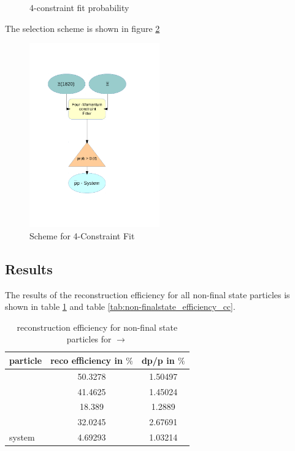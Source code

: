 	\begin{figure}
		\centering
		\caption{4-constraint fit probability}
		\label{fig:xisys_prob}
	\end{figure}
	
	The selection scheme is shown in figure \ref{fig:fourconstraintfit}
	 
	\begin{figure}
		\centering
			\includegraphics[width=0.50\textwidth]{./plots/combineCascadeSys.pdf}
		\caption{Scheme for 4-Constraint Fit}
		\label{fig:fourconstraintfit}
	\end{figure}
	
	\subsection*{Results}
	
	The results of the reconstruction efficiency for all non-final state particles is shown in table \ref{tab:non-finalstate_efficiency}
	and table \ref{tab:non-finalstate_efficiency_cc}.
	
	\begin{table}
		\centering
		\caption{reconstruction efficiency for non-final state particles for \pbarpSystem $\rightarrow$ \excitedcascade \anticascade}
		\label{tab:non-finalstate_efficiency}
		
		\begin{tabular}{lcc}
		
			\hline
			particle & reco efficiency in $\%$ & dp/p in $\%$ \\\hline
			\hline
			\lam & 50.3278&   1.50497 \\
			\alam & 41.4625&   1.45024\\
			\anticascade & 18.389&   1.2889\\
			\excitedcascade & 32.0245&   2.67691 \\
			\excitedcascade \anticascade system & 4.69293&   1.03214\\\hline
			 	
		\end{tabular}
	\end{table}
	
